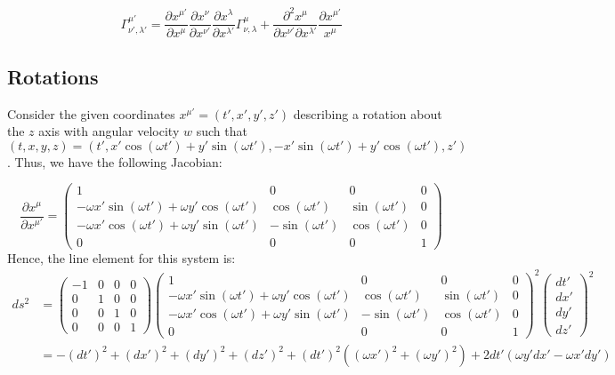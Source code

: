 \documentclass{article}
\begin{document}
 	$$\Gamma_{\nu', \lambda'}^{\mu '} = \frac{\partial x^{\mu '}}{\partial x^\mu}\frac{\partial x^{\nu}}{\partial x^{\nu'}}\frac{\partial x^{\lambda }}{\partial x^{\lambda'}} \Gamma_{\nu, \lambda}^\mu + \frac{\partial^2 x^\mu}{\partial x^{\nu '} \partial x^{\lambda '}} \frac{\partial x^{\mu '}}{x^\mu}$$ 
 	
	\subsection{Rotations}
	Consider the given coordinates $x^{\mu'} = (t', x', y', z')$ describing a rotation about the $z$ axis with angular velocity $w$ such that
	$$ (t,x,y,z) = (t', x'\cos (\omega t') + y' \sin (\omega t'), -x' \sin (\omega t') + y' \cos (\omega t'), z' )$$. Thus, we have the following Jacobian:
	
	$$ \frac{\partial x^\mu}{\partial x^{\mu '}} = \begin{pmatrix}
		1 & 0 & 0 & 0 \\
		- \omega x' \sin (\omega t') + \omega y' \cos (\omega t') & \cos (\omega t') & \sin (\omega t') & 0 \\
		- \omega x' \cos (\omega t') + \omega y' \sin (\omega t') & -\sin(\omega t') & \cos(\omega t') & 0 \\
		0 & 0 & 0& 1 
	\end{pmatrix}$$ 
 	Hence, the line element for this system is:
 	\begin{align*}
 		ds^2 &= \begin{pmatrix}
 			-1 & 0 & 0 & 0 \\
 			0 & 1 & 0 & 0 \\
 			0 & 0 & 1 & 0 \\
 			0 & 0 & 0 & 1
 		\end{pmatrix}\begin{pmatrix}
 		1 & 0 & 0 & 0 \\
 		- \omega x' \sin (\omega t') + \omega y' \cos (\omega t') & \cos (\omega t') & \sin (\omega t') & 0 \\
 		- \omega x' \cos (\omega t') + \omega y' \sin (\omega t') & -\sin(\omega t') & \cos(\omega t') & 0 \\
 		0 & 0 & 0& 1 
 	\end{pmatrix}^2
 	\begin{pmatrix}
 		dt'\\
 		dx'\\
 		dy'\\
 		dz'
 	\end{pmatrix}^2 \\
 		&= -(dt')^2 + (dx')^2 + (dy')^2 + (dz')^2 + (dt')^2((\omega x')^2 + (\omega y')^2) + 2dt' (\omega y' dx' - \omega x ' dy ')
 	\end{align*}
\end{document}
